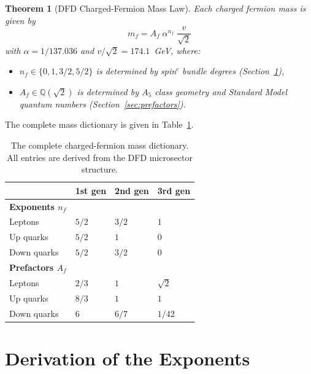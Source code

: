 \documentclass[11pt,a4paper]{article}
\newtheorem{theorem}{Theorem}
\theoremstyle{remark}
\begin{document}
\begin{theorem}[DFD Charged-Fermion Mass Law]
\label{thm:mass-law}
Each charged fermion mass is given by
\begin{equation}
\boxed{\quad m_f = A_f\;\alpha^{n_f}\;\frac{v}{\sqrt{2}}\quad}
\label{eq:master}
\end{equation}
with $\alpha = 1/137.036$ and $v/\sqrt{2} = 174.1$~GeV, where:
\begin{itemize}
\item $n_f \in \{0, 1, 3/2, 5/2\}$ is determined by spin$^c$ bundle degrees
  (Section~\ref{sec:exponents}),
\item $A_f \in \mathbb{Q}(\sqrt{2})$ is determined by $A_5$ class geometry
  and Standard Model quantum numbers (Section~\ref{sec:prefactors}).
\end{itemize}
\end{theorem}

The complete mass dictionary is given in Table~\ref{tab:dictionary}.

\begin{table}[h]
\centering
\renewcommand{\arraystretch}{1.2}
\begin{tabular}{@{}l >{\centering}p{1.6cm} >{\centering}p{1.6cm} >{\centering\arraybackslash}p{1.6cm}@{}}
\toprule
& 1st gen & 2nd gen & 3rd gen \\
\midrule
\textbf{Exponents $n_f$} & & & \\
\quad Leptons     & $5/2$ & $3/2$ & $1$ \\
\quad Up quarks   & $5/2$ & $1$   & $0$ \\
\quad Down quarks & $5/2$ & $3/2$ & $0$ \\
\midrule
\textbf{Prefactors $A_f$} & & & \\
\quad Leptons     & $2/3$   & $1$   & $\sqrt{2}$ \\
\quad Up quarks   & $8/3$   & $1$   & $1$        \\
\quad Down quarks & $6$     & $6/7$ & $1/42$     \\
\bottomrule
\end{tabular}
\caption{The complete charged-fermion mass dictionary.  All entries are
derived from the DFD microsector structure.}
\label{tab:dictionary}
\end{table}


\section{Derivation of the Exponents}
\label{sec:exponents}
\end{document}
